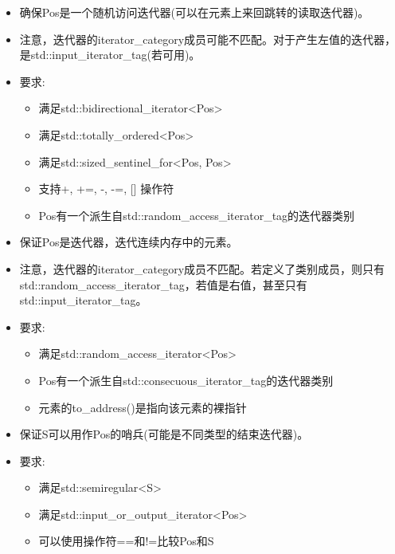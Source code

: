 \begin{itemize}
\item
确保Pos是一个随机访问迭代器(可以在元素上来回跳转的读取迭代器)。

\item
注意，迭代器的iterator\_category成员可能不匹配。对于产生左值的迭代器，是std::input\_iterator\_tag(若可用)。

\item
要求:
\begin{itemize}
\item
满足std::bidirectional\_iterator<Pos> 

\item
满足std::totally\_ordered<Pos> 

\item
满足std::sized\_sentinel\_for<Pos, Pos>

\item
支持+, +=, -, -=, [] 操作符

\item
Pos有一个派生自std::random\_access\_iterator\_tag的迭代器类别
\end{itemize}
\end{itemize}


\begin{itemize}
\item
保证Pos是迭代器，迭代连续内存中的元素。

\item
注意，迭代器的iterator\_category成员不匹配。若定义了类别成员，则只有std::random\_access\_iterator\_tag，若值是右值，甚至只有std::input\_iterator\_tag。

\item
要求:
\begin{itemize}
\item
满足std::random\_access\_iterator<Pos> 

\item
Pos有一个派生自std::consecuous\_iterator\_tag的迭代器类别

\item
元素的to\_address()是指向该元素的裸指针
\end{itemize}
\end{itemize}


\begin{itemize}
\item
保证S可以用作Pos的哨兵(可能是不同类型的结束迭代器)。

\item
要求:
\begin{itemize}
\item
满足std::semiregular<S>

\item
满足std::input\_or\_output\_iterator<Pos> 

\item
可以使用操作符==和!=比较Pos和S
\end{itemize}
\end{itemize}

